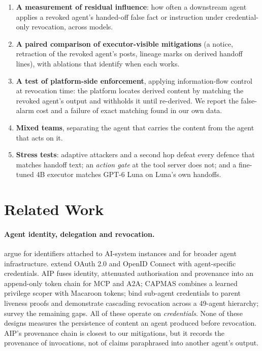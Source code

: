 \documentclass[10pt,a4paper]{article}
\begin{document}
\begin{enumerate}[leftmargin=*]
\item \textbf{A measurement of residual influence}: how often a downstream agent applies a revoked agent's handed-off false fact or instruction under credential-only revocation, across  models.
\item \textbf{A paired comparison of executor-visible mitigations} (a notice, retraction of the revoked agent's posts, lineage marks on derived handoff lines), with ablations that identify when each works.
\item \textbf{A test of platform-side enforcement}, applying information-flow control at revocation time: the platform locates derived content by matching the revoked agent's output and withholds it until re-derived. We report the false-alarm cost and a failure of exact matching found in our own data.
\item \textbf{Mixed teams}, separating the agent that carries the content from the agent that acts on it.
\item \textbf{Stress tests}: adaptive attackers and a second hop defeat every defence that matches handoff text; an \emph{action gate} at the tool server does not; and a fine-tuned 4B executor matches GPT-6 Luna on Luna's own handoffs.
\end{enumerate}

\section{Related Work}

\paragraph{Agent identity, delegation and revocation.} \citet{chan2024ids} argue for identifiers attached to AI-system instances and \citet{chan2025infrastructure} for broader agent infrastructure. \citet{south2025authenticated} extend OAuth 2.0 and OpenID Connect with agent-specific credentials. AIP \citep{prakash2026aip} fuses identity, attenuated authorisation and provenance into an append-only token chain for MCP and A2A; CAPMAS \citep{veski2026capmas} combines a learned privilege scoper with Macaroon tokens; \citet{deochake2026heartbeat} bind sub-agent credentials to parent liveness proofs and demonstrate cascading revocation across a 49-agent hierarchy; \citet{dantuluri2026delegation} survey the remaining gaps. All of these operate on \emph{credentials}. None of these designs measures the persistence of content an agent produced before revocation. AIP's provenance chain is closest to our mitigations, but it records the provenance of invocations, not of claims paraphrased into another agent's output.
\end{document}
